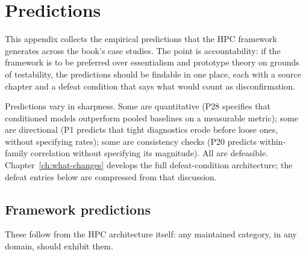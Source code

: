 \chapter{Predictions}
\label{app:predictions}

This appendix collects the empirical predictions that the HPC framework generates across the book's case studies. The point is accountability: if the framework is to be preferred over essentialism and prototype theory on grounds of testability, the predictions should be findable in one place, each with a source chapter and a defeat condition that says what would count as disconfirmation.

Predictions vary in sharpness. Some are quantitative (P28 specifies that conditioned models outperform pooled baselines on a measurable metric); some are directional (P1 predicts that tight diagnostics erode before loose ones, without specifying rates); some are consistency checks (P20 predicts within-family correlation without specifying its magnitude). All are defeasible. Chapter~\ref{ch:what-changes} develops the full defeat-condition architecture; the defeat entries below are compressed from that discussion.

\newcommand{\prediction}[5]{%
  \item[\textbf{#1.}] \textbf{#2.}
  #3
  \par\noindent\hspace{1em}\textit{Source:} #4.
  \textit{Defeat:} #5.
  \medskip
}

\section{Framework predictions}

These follow from the HPC architecture itself: any maintained category, in any domain, should exhibit them.

